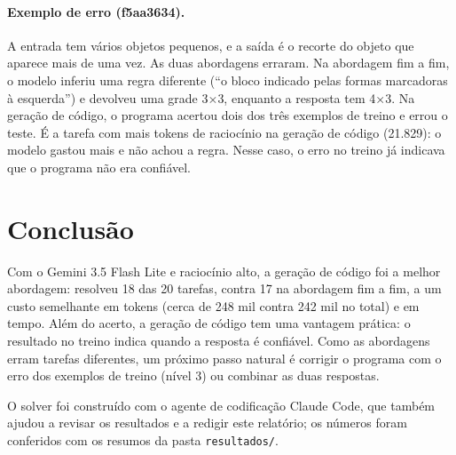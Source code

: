 \documentclass{article}
\begin{document}
\paragraph{Exemplo de erro (f5aa3634).} A entrada tem vários objetos pequenos, e a saída é o
recorte do objeto que aparece mais de uma vez. As duas abordagens erraram. Na abordagem fim a
fim, o modelo inferiu uma regra diferente (``o bloco indicado pelas formas marcadoras à
esquerda'') e devolveu uma grade 3$\times$3, enquanto a resposta tem 4$\times$3. Na geração de
código, o programa acertou dois dos três exemplos de treino e errou o teste. É a tarefa com
mais tokens de raciocínio na geração de código (21.829): o modelo gastou mais e não achou a
regra. Nesse caso, o erro no treino já indicava que o programa não era confiável.

\section{Conclusão}

Com o Gemini 3.5 Flash Lite e raciocínio alto, a geração de código foi a melhor abordagem:
resolveu 18 das 20 tarefas, contra 17 na abordagem fim a fim, a um custo semelhante em tokens
(cerca de 248 mil contra 242 mil no total) e em tempo. Além do acerto, a geração de código tem
uma vantagem prática: o resultado no treino indica quando a resposta é confiável. Como as
abordagens erram tarefas diferentes, um próximo passo natural é corrigir o programa com o erro
dos exemplos de treino (nível 3) ou combinar as duas respostas.

O solver foi construído com o agente de codificação Claude Code, que também ajudou a revisar
os resultados e a redigir este relatório; os números foram conferidos com os resumos da pasta
\texttt{resultados/}.



\end{document}
